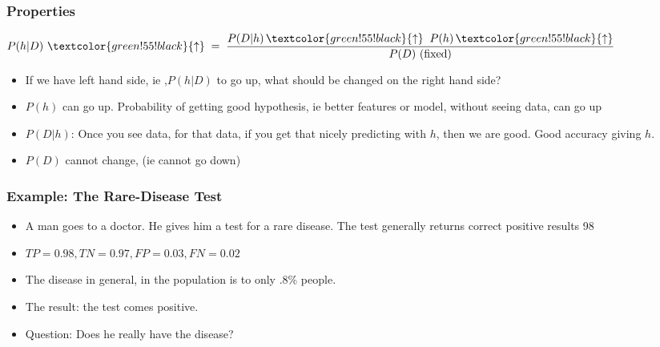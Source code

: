 \begin{frame}[fragile]\frametitle{Properties}

\begin{center}
$P(h|D)\ \textcolor{green!55!black}{\uparrow} \;=\; \dfrac{P(D|h)\,\textcolor{green!55!black}{\uparrow}\;\; P(h)\,\textcolor{green!55!black}{\uparrow}}{P(D)\ \text{(fixed)}}$
\end{center}

\begin{itemize}
\item If we have left hand side, ie ,$P(h|D)$ to go up, what should be changed on the right hand side?
\item $P(h)$ can go up. Probability of getting good hypothesis, ie better features or model, without seeing data, can go up
\item $P(D|h)$: Once you see data, for that data,  if you get that nicely predicting with $h$, then we are good. Good accuracy giving $h$.
\item $P(D)$ cannot change, (ie cannot go down)

\end{itemize}

\end{frame}

\begin{frame}[fragile]\frametitle{Example: The Rare-Disease Test}

\begin{itemize}
\item A man goes to a doctor. He gives him a test for a rare disease. The test generally returns correct positive results 98%
\item $TP=0.98, TN=0.97, FP=0.03, FN=0.02$
\item The disease in general, in the population is to only .8\% people.
\item The result: the test comes positive.
\item Question: Does he really have the disease?


\end{itemize}

\end{frame}

